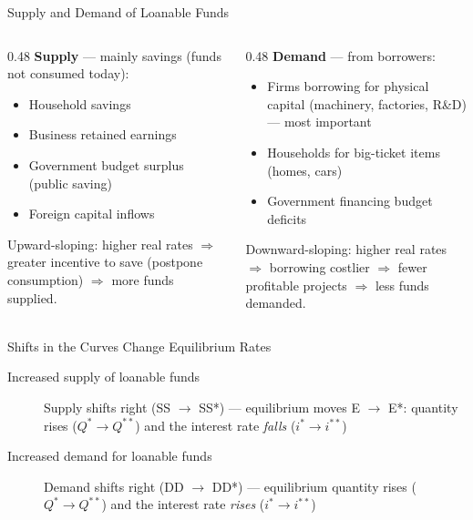 \documentclass[aspectratio=169]{beamer}
\begin{document}
\begin{frame}{Supply and Demand of Loanable Funds}
\begin{columns}
\begin{column}{0.48\textwidth}
\textbf{Supply} --- mainly savings (funds not consumed today):
\begin{itemize}
  \item Household savings
  \item Business retained earnings
  \item Government budget surplus (public saving)
  \item Foreign capital inflows
\end{itemize}
\vspace{0.2em}
Upward-sloping: higher real rates $\Rightarrow$ greater incentive to save (postpone consumption) $\Rightarrow$ more funds supplied.
\end{column}
\begin{column}{0.48\textwidth}
\textbf{Demand} --- from borrowers:
\begin{itemize}
  \item Firms borrowing for physical capital (machinery, factories, R\&D) --- most important
  \item Households for big-ticket items (homes, cars)
  \item Government financing budget deficits
\end{itemize}
\vspace{0.2em}
Downward-sloping: higher real rates $\Rightarrow$ borrowing costlier $\Rightarrow$ fewer profitable projects $\Rightarrow$ less funds demanded.
\end{column}
\end{columns}
\end{frame}

\begin{frame}{Shifts in the Curves Change Equilibrium Rates}
\begin{description}
  \item[Increased supply of loanable funds] Supply shifts right (SS $\to$ SS*) --- equilibrium moves E $\to$ E*: quantity rises ($Q^* \to Q^{**}$) and the interest rate \emph{falls} ($i^* \to i^{**}$)
  \item[Increased demand for loanable funds] Demand shifts right (DD $\to$ DD*) --- equilibrium quantity rises ($Q^* \to Q^{**}$) and the interest rate \emph{rises} ($i^* \to i^{**}$)
\end{description}
\end{frame}
\end{document}
